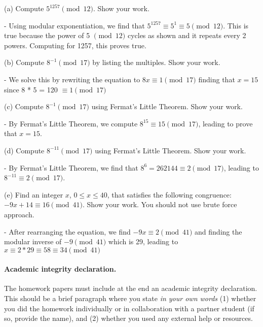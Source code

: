 \documentclass{article}
\begin{document}
\begin{problem}

\medskip\noindent
(a) Compute $5^{1257}\pmod{12}$. Show your work.

\vspace{0.1in}
\indent - Using modular exponentiation, we find that $5^{1257} \equiv 5^1 \equiv 5 \pmod{12}$. This is true because the power of 5 $\pmod{12}$ cycles as shown and it repeats every 2 powers. Computing for 1257, this proves true. 

\medskip\noindent
(b) Compute $8^{-1}\pmod{17}$ by listing the multiples. Show your work.

\vspace{0.1in}
\indent - We solve this by rewriting the equation to $8x \equiv 1 \pmod{17}$ finding that $x = 15$ since 8 * 5 = 120 $\equiv 1 \pmod{17}$

\medskip\noindent
(c) Compute $8^{-1}\pmod{17}$ using Fermat's Little Theorem. Show your work.

\vspace{0.1in}
\indent - By Fermat's Little Theorem, we compute $8^{15} \equiv 15 \pmod{17}$, leading to prove that $x = 15$.

\medskip\noindent
(d) Compute $8^{-11}\pmod{17}$ using Fermat's Little Theorem. Show your work.

\vspace{0.1in}
\indent - By Fermat's Little Theorem, we find that $8^6 = 262144 \equiv 2 \pmod{17}$, leading to $8^{-11} \equiv 2 \pmod{17}$.

\medskip\noindent
(e) Find an integer $x$, $0\le x \le 40$, that satisfies the following congruence:
$-9x + 14 \equiv 16 \pmod{41}$. Show your work. You should not use brute force approach.

\vspace{0.1in}
\indent - After rearranging the equation, we find $-9x \equiv 2 \pmod{41}$ and finding the modular inverse of $-9 \pmod{41}$ which is 29, leading to $x \equiv 2 * 29 \equiv 58 \equiv 34 \pmod{41}$

\end{problem}



\paragraph{Academic integrity declaration.}
The homework papers must include at the end an academic integrity declaration. This should be a brief paragraph where you state
\emph{in your own words}  (1) whether you did the homework individually or in collaboration with a partner student (if so, provide the name), 
and (2) whether you used any external help or resources. 
\end{document}
